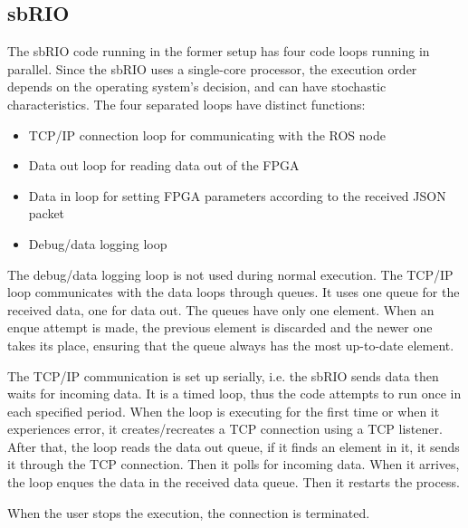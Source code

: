 \subsection{sbRIO}\label{sec:sbrio}

The sbRIO code running in the former setup has four code loops running in parallel. Since the sbRIO uses a single-core processor, the execution order depends on the operating system's decision, and can have stochastic characteristics. The four separated loops have distinct functions:

\begin{itemize}
	\item TCP/IP connection loop for communicating with the ROS node
	\item Data out loop for reading data out of the FPGA
	\item Data in loop for setting FPGA parameters according to the received JSON packet
	\item Debug/data logging loop
\end{itemize}

The debug/data logging loop is not used during normal execution. The TCP/IP loop communicates with the data loops through queues. It uses one queue for the received data, one for data out. The queues have only one element. When an enque attempt is made, the previous element is discarded and the newer one takes its place, ensuring that the queue always has the most up-to-date element.

The TCP/IP communication is set up serially, i.e. the sbRIO sends data then waits for incoming data. It is a timed loop, thus the code attempts to run once in each specified period. When the loop is executing for the first time or when it experiences error, it creates/recreates a TCP connection using a TCP listener. After that, the loop reads the data out queue, if it finds an element in it, it sends it through the TCP connection. Then it polls for incoming data. When it arrives, the loop enques the data in the received data queue. Then it restarts the process.

When the user stops the execution, the connection is terminated.